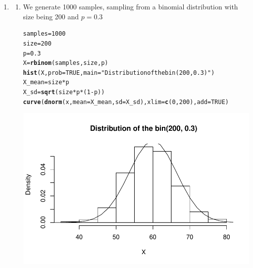 \documentclass[12pt, a4paper]{article}\usepackage[]{graphicx}\usepackage[]{color}
\makeatletter
\def\maxwidth{ %
  \ifdim\Gin@nat@width>\linewidth
    \linewidth
  \else
    \Gin@nat@width
  \fi
}
\newcommand{\hlnum}[1]{\textcolor[rgb]{0.686,0.059,0.569}{#1}}%
\newcommand{\hlstr}[1]{\textcolor[rgb]{0.192,0.494,0.8}{#1}}%
\newcommand{\hlopt}[1]{\textcolor[rgb]{0,0,0}{#1}}%
\newcommand{\hlstd}[1]{\textcolor[rgb]{0.345,0.345,0.345}{#1}}%
\newcommand{\hlkwb}[1]{\textcolor[rgb]{0.69,0.353,0.396}{#1}}%
\newcommand{\hlkwc}[1]{\textcolor[rgb]{0.333,0.667,0.333}{#1}}%
\newcommand{\hlkwd}[1]{\textcolor[rgb]{0.737,0.353,0.396}{\textbf{#1}}}%
\newenvironment{kframe}{%
 \def\at@end@of@kframe{}%
 \ifinner\ifhmode%
  \def\at@end@of@kframe{\end{minipage}}%
  \begin{minipage}{\columnwidth}%
 \fi\fi%
 \def\FrameCommand##1{\hskip\@totalleftmargin \hskip-\fboxsep
 \colorbox{shadecolor}{##1}\hskip-\fboxsep
     \hskip-\linewidth \hskip-\@totalleftmargin \hskip\columnwidth}%
 \MakeFramed {\advance\hsize-\width
   \@totalleftmargin\z@ \linewidth\hsize
   \@setminipage}}%
 {\par\unskip\endMakeFramed%
 \at@end@of@kframe}
\newenvironment{knitrout}{}{} %
\makeatother
\begin{document}


\pagestyle{default}
\thispagestyle{empty}

\newpage
\setcounter{page}{1}
\begin{enumerate}
  \item 
  \begin{enumerate}[label=(\alph*)]
  \item We generate 1000 samples, sampling from a binomial distribution with size being 200 and $p = 0.3$
  
\begin{knitrout}\small
{}\color{fgcolor}\begin{kframe}
\begin{alltt}
\hlstd{samples} \hlkwb{=} \hlnum{1000}
\hlstd{size} \hlkwb{=} \hlnum{200}
\hlstd{p} \hlkwb{=} \hlnum{0.3}
\hlstd{X} \hlkwb{=} \hlkwd{rbinom}\hlstd{(samples, size, p)}
\hlkwd{hist}\hlstd{(X,} \hlkwc{prob} \hlstd{=} \hlnum{TRUE}\hlstd{,} \hlkwc{main} \hlstd{=} \hlstr{"Distribution of the bin(200, 0.3)"}\hlstd{)}
\hlstd{X_mean} \hlkwb{=} \hlstd{size} \hlopt{*} \hlstd{p}
\hlstd{X_sd} \hlkwb{=} \hlkwd{sqrt}\hlstd{(size} \hlopt{*} \hlstd{p} \hlopt{*} \hlstd{(}\hlnum{1} \hlopt{-} \hlstd{p))}
\hlkwd{curve}\hlstd{(}\hlkwd{dnorm}\hlstd{(x,} \hlkwc{mean} \hlstd{= X_mean,} \hlkwc{sd} \hlstd{= X_sd),} \hlkwc{xlim} \hlstd{=} \hlkwd{c}\hlstd{(}\hlnum{0}\hlstd{,} \hlnum{200}\hlstd{),} \hlkwc{add} \hlstd{=} \hlnum{TRUE}\hlstd{)}
\end{alltt}
\end{kframe}

{\centering \includegraphics[width=\maxwidth]{figure/unnamed-chunk-2-1} 

}
\end{knitrout}
\end{enumerate}
\end{enumerate}
\end{document}
